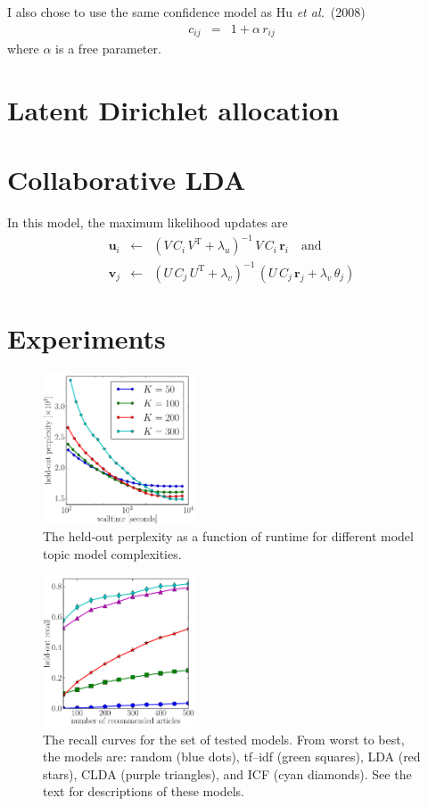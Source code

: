 \documentclass[11pt]{article}
\newcommand{\figlabel}[1]{\label{fig:#1}}
\newcommand{\etal}{\emph{et al.}}
\begin{document}
I also chose to use the same confidence model as Hu \etal~(2008)
\begin{eqnarray}
c_{ij} &=& 1+\alpha\,r_{ij}
\end{eqnarray}
where $\alpha$ is a free parameter.

\section{Latent Dirichlet allocation}

\section{Collaborative LDA}

In this model, the maximum likelihood updates are \cite{ctr}
\begin{eqnarray}
\mathbf{u}_i &\gets& (V\,C_i\,V^\mathrm{T}+\lambda_u)^{-1}\,
                     V\,C_i\,\mathbf{r}_i
\quad \mathrm{and} \\
\mathbf{v}_j &\gets& (U\,C_j\,U^\mathrm{T} + \lambda_v)^{-1}\,(U\,C_j\,
                     \mathbf{r}_j + \lambda_v\,\theta_j) \nonumber
\end{eqnarray}

\section{Experiments}

\begin{figure}
\centering
\includegraphics[width=0.4\textwidth]{lda-results-k.pdf}
\caption{%
The held-out perplexity as a function of runtime for different model
topic model complexities.
\figlabel{lda-results}}
\end{figure}

\begin{figure}
\centering
\includegraphics[width=0.4\textwidth]{results.pdf}
\caption{%
The recall curves for the set of tested models.
From worst to best, the models are: random (blue dots), tf--idf (green
squares), LDA (red stars), CLDA (purple triangles), and ICF (cyan diamonds).
See the text for descriptions of these models.
\figlabel{results}}
\end{figure}
\end{document}
